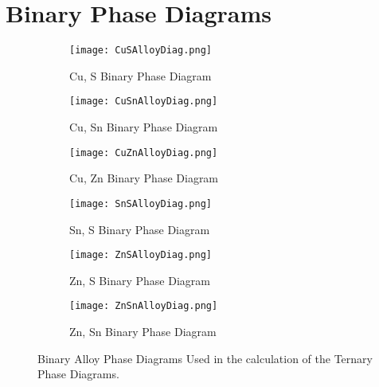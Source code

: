 
\chapter{Binary Phase Diagrams} %

\label{AppendixB} %


\begin{figure}[h]
\centering
\begin{subfigure}{70mm}
  \centering
    \texttt{[image: CuSAlloyDiag.png]}
    \caption{Cu, S Binary Phase Diagram\citep{Hay2000}}
    \label{fig:CuS}
\end{subfigure}%
\begin{subfigure}{70mm}
 \centering
    \texttt{[image: CuSnAlloyDiag.png]}
    \caption{Cu, Sn Binary Phase Diagram\citep{Hay2000}}
    \label{fig:CuSn}
\end{subfigure}
\begin{subfigure}{70mm}
 \centering
    \texttt{[image: CuZnAlloyDiag.png]}
    \caption{Cu, Zn Binary Phase Diagram\citep{Hay2000}}
    \label{fig:CuZn}
\end{subfigure}
\begin{subfigure}{70mm}
 \centering
    \texttt{[image: SnSAlloyDiag.png]}
    \caption{Sn, S Binary Phase Diagram\citep{Hay2000}}
    \label{fig:SnS}
\end{subfigure}
\begin{subfigure}{70mm}
 \centering
    \texttt{[image: ZnSAlloyDiag.png]}
    \caption{Zn, S Binary Phase Diagram\citep{Sharma1996}}
    \label{fig:ZnS}
\end{subfigure}
\begin{subfigure}{70mm}
 \centering
    \texttt{[image: ZnSnAlloyDiag.png]}
    \caption{Zn, Sn Binary Phase Diagram\citep{Hay2000}}
    \label{fig:ZnSn}
\end{subfigure}
\caption{Binary Alloy Phase Diagrams Used in the calculation of the Ternary Phase Diagrams.}
\label{fig:BinaryAlloyPhaseDiagrams}
\end{figure}